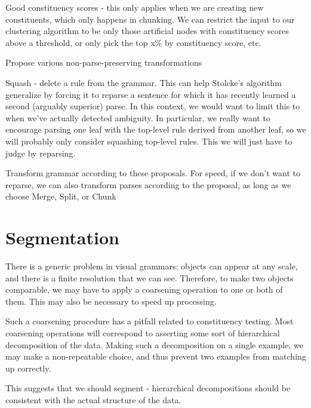 \documentclass{article}
\begin{document}
\item Good constituency scores - this only applies when we are
  creating new constituents, which only happens in chunking. We can
  restrict the input to our clustering algorithm to be only those
  artificial nodes with constituency scores above a threshold, or only
  pick the top x\% by constituency score, etc.
 
\eitem

\item Propose various non-parse-preserving transformations
\bitem
\item   Squash - delete a rule from the grammar. This can help Stolcke's
algorithm generalize by forcing it to reparse a sentence for which it
has recently learned a second (arguably superior) parse. In this
context, we would want to limit this to when we've actually detected
ambiguity. In particular, we really want to encourage parsing one leaf
with the top-level rule derived from another leaf, so we will probably
only consider squashing top-level rules.
\eitem
This we will just have to judge by reparsing.

\item Transform grammar according to these proposals. For speed, if we
  don't want to reparse, we can also transform parses according to the
  proposal, as long as we choose Merge, Split, or Chunk

\eenum

\eenum

\section{Segmentation}

There is a generic problem in visual grammars: objects can appear at
any scale, and there is a finite resolution that we can
see. Therefore, to make two objects comparable, we may have to apply a
coarsening operation to one or both of them. This may also be
necessary to speed up processing.

Such a coarsening procedure has a pitfall related to constituency
testing. Most coarsening operations will correspond to asserting some
sort of hierarchical decomposition of the data. Making such a
decomposition on a single example, we may make a non-repeatable
choice, and thus prevent two examples from matching up correctly.

This suggests that we should segment - hierarchical decompositions
should be consistent with the actual structure of the data.
\end{document}
